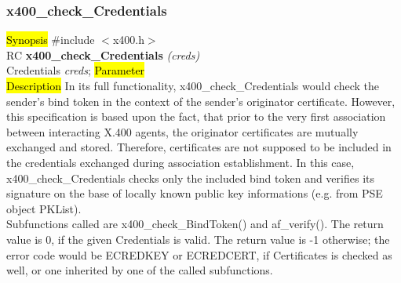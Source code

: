 \subsubsection{x400\_check\_Credentials}
\label{x4_ck_Cred}
\hl{Synopsis}
\#include $<$x400.h$>$ \\ [1ex]
RC {\bf x400\_check\_Credentials} {\em (creds)} \\
Credentials {\em *creds};
\hl{Parameter}
 \\[1ex]
\hl{Description}
In its full functionality,
x400\_check\_Credentials would check the sender's bind token in the
context of the sender's originator certificate.
However, this specification is based upon the fact,
that prior to the very first association between interacting X.400 agents,
the originator certificates are mutually exchanged and stored.
Therefore, certificates are not supposed to be included
in the credentials exchanged during association establishment.
In this case,
x400\_check\_Credentials checks only the included bind token
and verifies its signature on the base of locally known public key
informations (e.g. from PSE object PKList).
\\
Subfunctions called are x400\_check\_BindToken() and af\_verify().
The return value is 0, if the given Credentials is valid.
The return value is -1 otherwise;
the error code would be ECREDKEY
or ECREDCERT, if Certificates is checked as well,
or one inherited by one of the called subfunctions.

